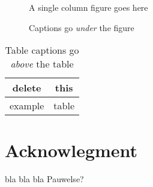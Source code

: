 \documentclass[twocolumn,english,compsoc,journal]{IEEEtran}
\providecommand{\tabularnewline}{\\}
\begin{document}
\begin{figure}[htbp]
\begin{centering}
\textsf{A single column figure goes here}
\par\end{centering}

\protect\caption{Captions go \emph{under} the figure}
\end{figure}
\begin{table}[htbp]
\protect\caption{Table captions go \emph{above} the table}


\centering{}%
\begin{tabular}{|c|c|}
\hline 
delete & this\tabularnewline
\hline 
\hline 
example & table\tabularnewline
\hline 
\end{tabular}
\end{table}



\section*{Acknowlegment}

bla bla bla Pauwelse?



\end{document}

